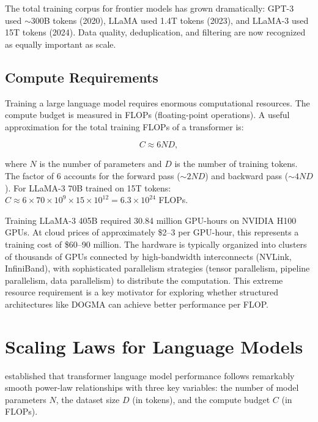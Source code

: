 The total training corpus for frontier models has grown dramatically: GPT-3 used $\sim$300B tokens (2020), LLaMA used 1.4T tokens (2023), and LLaMA-3 used 15T tokens (2024). Data quality, deduplication, and filtering are now recognized as equally important as scale.

\subsection{Compute Requirements}

Training a large language model requires enormous computational resources. The compute budget is measured in FLOPs (floating-point operations). A useful approximation for the total training FLOPs of a transformer is:

\begin{equation}
C \approx 6 N D,
\label{eq:training-flops}
\end{equation}

where $N$ is the number of parameters and $D$ is the number of training tokens. The factor of 6 accounts for the forward pass ($\sim 2ND$) and backward pass ($\sim 4ND$). For LLaMA-3 70B trained on 15T tokens: $C \approx 6 \times 70 \times 10^9 \times 15 \times 10^{12} = 6.3 \times 10^{24}$ FLOPs.

\begin{implnote}
Training LLaMA-3 405B required 30.84 million GPU-hours on NVIDIA H100 GPUs. At cloud prices of approximately \$2--3 per GPU-hour, this represents a training cost of \$60--90 million. The hardware is typically organized into clusters of thousands of GPUs connected by high-bandwidth interconnects (NVLink, InfiniBand), with sophisticated parallelism strategies (tensor parallelism, pipeline parallelism, data parallelism) to distribute the computation. This extreme resource requirement is a key motivator for exploring whether structured architectures like DOGMA can achieve better performance per FLOP.
\end{implnote}

\section{Scaling Laws for Language Models}
\label{sec:scaling-laws}

\citet{kaplan2020} established that transformer language model performance follows remarkably smooth power-law relationships with three key variables: the number of model parameters $N$, the dataset size $D$ (in tokens), and the compute budget $C$ (in FLOPs).

